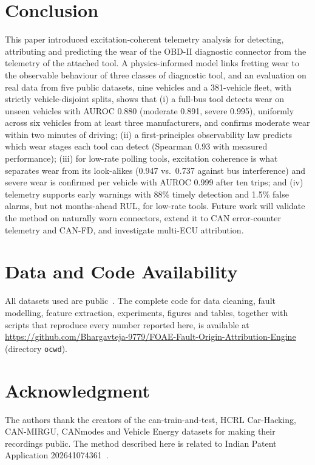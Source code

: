 \section{Conclusion}
\label{sec:conclusion}
This paper introduced excitation-coherent telemetry analysis for
detecting, attributing and predicting the wear of the OBD-II diagnostic
connector from the telemetry of the attached tool. A physics-informed model
links fretting wear to the observable behaviour of three classes of
diagnostic tool, and an evaluation on real data from five public datasets,
nine vehicles and a 381-vehicle fleet, with strictly vehicle-disjoint
splits, shows that (i) a full-bus tool detects wear on unseen vehicles with
AUROC 0.880 (moderate 0.891, severe 0.995), uniformly across six vehicles
from at least three manufacturers, and confirms moderate wear within two minutes of
driving; (ii) a first-principles observability law predicts which wear
stages each tool can detect (Spearman 0.93 with measured performance);
(iii) for low-rate polling tools, excitation coherence is what separates
wear from its look-alikes (0.947 vs.\ 0.737 against bus interference) and
severe wear is confirmed per vehicle with AUROC 0.999 after ten trips; and
(iv) telemetry supports early warnings with 88\% timely detection and 1.5\%
false alarms, but not months-ahead RUL, for low-rate tools. Future work will
validate the method on naturally worn connectors, extend it to CAN
error-counter telemetry and CAN-FD, and investigate multi-ECU attribution.

\section*{Data and Code Availability}
All datasets used are public~\cite{cantrain,hcrl_gids,mirgu,canmodes,ved}.
The complete code for data cleaning, fault modelling, feature extraction,
experiments, figures and tables, together with scripts that reproduce every
number reported here, is available at
\url{https://github.com/Bhargavteja-9779/FOAE-Fault-Origin-Attribution-Engine}
(directory \texttt{ocwd}).

\section*{Acknowledgment}
The authors thank the creators of the can-train-and-test, HCRL Car-Hacking, CAN-MIRGU, CANmodes
and Vehicle Energy datasets for making their recordings public. The
method described here is related to Indian Patent Application
202641074361~\cite{patent_in}.
